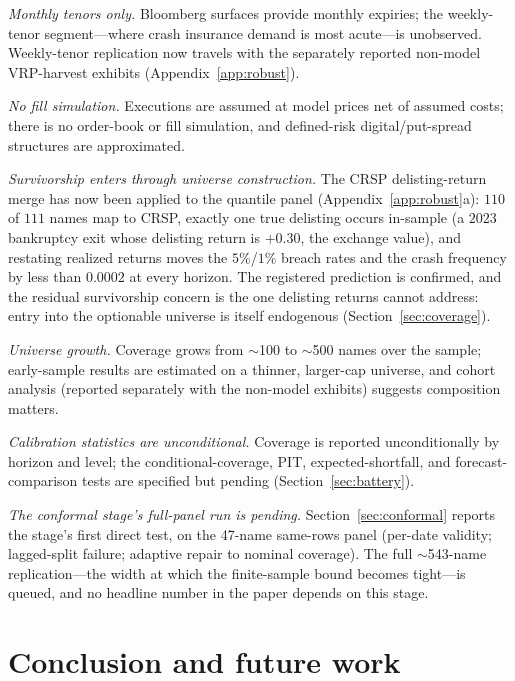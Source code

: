 \documentclass[11pt]{article}
\begin{document}
\emph{Monthly tenors only.} Bloomberg surfaces provide monthly expiries; the weekly-tenor segment---where crash insurance demand is most acute---is unobserved. Weekly-tenor replication now travels with the separately reported non-model VRP-harvest exhibits (Appendix~\ref{app:robust}).

\emph{No fill simulation.} Executions are assumed at model prices net of assumed costs; there is no order-book or fill simulation, and defined-risk digital/put-spread structures are approximated.

\emph{Survivorship enters through universe construction.} The CRSP delisting-return merge has now been applied to the quantile panel (Appendix~\ref{app:robust}a): $110$ of $111$ names map to CRSP, exactly one true delisting occurs in-sample (a $2023$ bankruptcy exit whose delisting return is $+0.30$, the exchange value), and restating realized returns moves the $5\%$/$1\%$ breach rates and the crash frequency by less than $0.0002$ at every horizon. The registered prediction is confirmed, and the residual survivorship concern is the one delisting returns cannot address: entry into the optionable universe is itself endogenous (Section~\ref{sec:coverage}).

\emph{Universe growth.} Coverage grows from $\sim$100 to $\sim$500 names over the sample; early-sample results are estimated on a thinner, larger-cap universe, and cohort analysis (reported separately with the non-model exhibits) suggests composition matters.

\emph{Calibration statistics are unconditional.} Coverage is reported unconditionally by horizon and level; the conditional-coverage, PIT, expected-shortfall, and forecast-comparison tests are specified but pending (Section~\ref{sec:battery}).

\emph{The conformal stage's full-panel run is pending.} Section~\ref{sec:conformal} reports the stage's first direct test, on the 47-name same-rows panel (per-date validity; lagged-split failure; adaptive repair to nominal coverage). The full $\sim$543-name replication---the width at which the finite-sample bound becomes tight---is queued, and no headline number in the paper depends on this stage.

\section{Conclusion and future work}\label{sec:conclusion}
\end{document}
